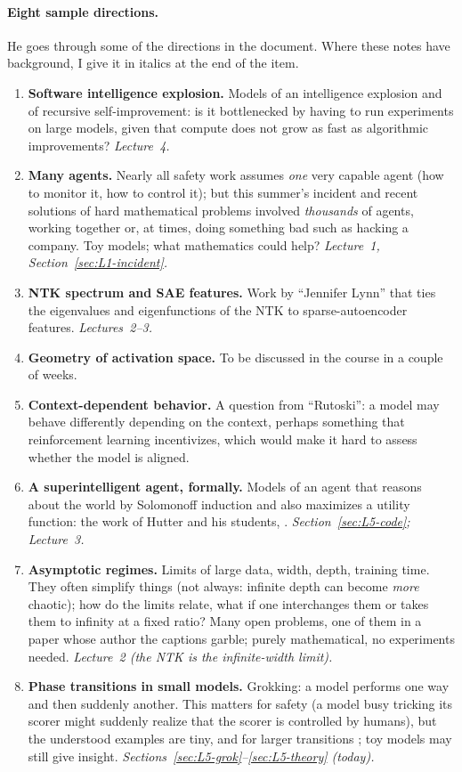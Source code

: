 \paragraph{Eight sample directions.}
He goes through some of the directions in the document. Where these notes have background, I give it in italics at the end of the item.
\begin{enumerate}[leftmargin=1.5em, itemsep=0.2em]
  \item \textbf{Software intelligence explosion.} Models of an intelligence explosion and of recursive self-improvement: is it bottlenecked by having to run experiments on large models, given that compute does not grow as fast as algorithmic improvements? \emph{Lecture~4.}
  \item \textbf{Many agents.} Nearly all safety work assumes \emph{one} very capable agent (how to monitor it, how to control it); but this summer's incident and recent solutions of hard mathematical problems involved \emph{thousands} of agents, working together or, at times, doing something bad such as hacking a company. Toy models; what mathematics could help? \emph{Lecture~1, Section~\ref{sec:L1-incident}.}
  \item \textbf{NTK spectrum and SAE features.} Work by ``Jennifer Lynn''\flag{} that ties the eigenvalues and eigenfunctions of the NTK to sparse-autoencoder features. \emph{Lectures~2--3.}
  \item \textbf{Geometry of activation space.} To be discussed in the course in a couple of weeks.
  \item \textbf{Context-dependent behavior.} A question from ``Rutoski''\flag{}: a model may behave differently depending on the context, perhaps something that reinforcement learning incentivizes, which would make it hard to assess whether the model is aligned.
  \item \textbf{A superintelligent agent, formally.} Models of an agent that reasons about the world by Solomonoff induction and also maximizes a utility function: the work of Hutter and his students, . \emph{Section~\ref{sec:L5-code}; Lecture~3.}
  \item \textbf{Asymptotic regimes.} Limits of large data, width, depth, training time. They often simplify things (not always: infinite depth can become \emph{more} chaotic); how do the limits relate, what if one interchanges them or takes them to infinity at a fixed ratio? Many open problems, one of them in a paper whose author the captions garble\flag{}; purely mathematical, no experiments needed. \emph{Lecture~2 (the NTK is the infinite-width limit).}
  \item \textbf{Phase transitions in small models.} Grokking: a model performs one way and then suddenly another. This matters for safety (a model busy tricking its scorer might suddenly realize that the scorer is controlled by humans), but the understood examples are tiny, and for larger transitions ; toy models may still give insight. \emph{Sections~\ref{sec:L5-grok}--\ref{sec:L5-theory} (today).}
\end{enumerate}

